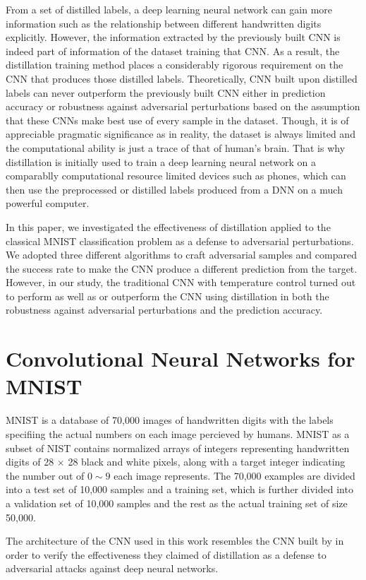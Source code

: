 \documentclass{article}
\begin{document}
From a set of distilled labels, a deep learning neural network can gain more information such as the relationship between different handwritten digits explicitly. However, the information extracted by the previously built CNN is indeed part of information of the dataset training that CNN.
As a result, the distillation training method places a considerably rigorous requirement on the CNN that produces those distilled labels.
Theoretically, CNN built upon distilled labels can never outperform the previously built CNN either in prediction accuracy or robustness against adversarial perturbations based on the assumption that these CNNs make best use of every sample in the dataset. 
Though, it is of appreciable pragmatic significance as in reality, the dataset is always limited and the computational ability is just a trace of that of human's brain.
That is why distillation is initially used to train a deep learning neural network on a comparablly computational resource limited devices such as phones, which can then use the preprocessed or distilled labels produced from a DNN on a much powerful computer.

In this paper, we investigated the effectiveness of distillation applied to the classical MNIST classification problem as a defense to adversarial perturbations. We adopted three different algorithms to craft adversarial samples and compared the success rate to make the CNN produce a different prediction from the target.
However, in our study, the traditional CNN with temperature control turned out to perform as well as or outperform the CNN using distillation in both the robustness against adversarial perturbations and the prediction accuracy. 

\section{Convolutional Neural Networks for MNIST}
MNIST is a database of 70,000 images of handwritten digits with the labels specifiing the actual numbers on each image percieved by humans\cite{MNIST}. MNIST as a subset of NIST contains normalized arrays of integers representing handwritten digits of 28 $\times$ 28 black and white pixels, along with a target integer indicating the number out of $0\sim 9$ each image represents.
The 70,000 examples are divided into a test set of 10,000 samples and a training set, which is further divided into a validation set of 10,000 samples and the rest as the actual training set of size 50,000.

The architecture of the CNN used in this work resembles the CNN built by \cite{Papernot} in order to verify the effectiveness they claimed of distillation as a defense to adversarial attacks against deep neural networks.\cite{MNIST} 
\end{document}
